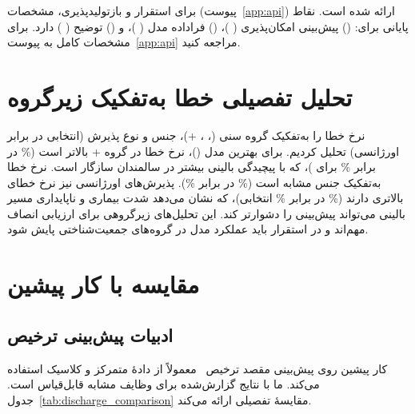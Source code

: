 برای استقرار و بازتولیدپذیری، مشخصات  (پیوست~\ref{app:api}) ارائه شده است.  نقاط پایانی برای: () پیش‌بینی امکان‌پذیری ( \texttt{})، () فراداده مدل ( \texttt{})، و () توضیح  ( \texttt{}) دارد. برای مشخصات کامل  به پیوست~\ref{app:api} مراجعه کنید.

\section{تحلیل تفصیلی خطا به‌تفکیک زیرگروه}

نرخ خطا را به‌تفکیک گروه سنی (، ، +)، جنس و نوع پذیرش (انتخابی در برابر اورژانسی) تحلیل کردیم. برای بهترین مدل ()، نرخ خطا در گروه + بالاتر است (\% در برابر \% برای )، که با پیچیدگی بالینی بیشتر در سالمندان سازگار است. نرخ خطا به‌تفکیک جنس مشابه است (\% در برابر \%). پذیرش‌های اورژانسی نیز نرخ خطای بالاتری دارند (\% در برابر \% انتخابی)، که نشان می‌دهد شدت بیماری و ناپایداری مسیر بالینی می‌تواند پیش‌بینی را دشوارتر کند. این تحلیل‌های زیرگروهی برای ارزیابی انصاف مهم‌اند و در استقرار باید عملکرد مدل در گروه‌های جمعیت‌شناختی پایش شود.

\section{مقایسه با کار پیشین}

\subsection{ادبیات پیش‌بینی ترخیص}

کار پیشین روی پیش‌بینی مقصد ترخیص~\cite{awad2017random,caruana2015intelligible} معمولاً از دادۀ متمرکز و  کلاسیک استفاده می‌کند.   ما با نتایج گزارش‌شده برای وظایف مشابه قابل‌قیاس است. جدول~\ref{tab:discharge_comparison} مقایسۀ تفصیلی ارائه می‌کند.

